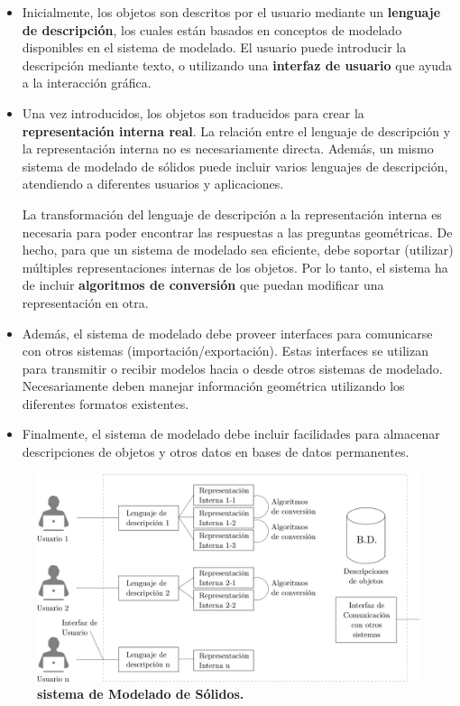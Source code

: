 \begin{itemize}
\item Inicialmente, los objetos son descritos por el usuario mediante un \textbf{lenguaje de descripción}, los cuales están basados en conceptos de modelado disponibles en el sistema de modelado. El usuario puede introducir la descripción mediante texto, o utilizando una \textbf{interfaz de usuario} que ayuda a la interacción gráfica.

\item Una vez introducidos, los objetos son traducidos para crear la \textbf{representación interna real}. La relación entre el lenguaje de descripción y la representación interna no es necesariamente directa. Además, un mismo sistema de modelado de sólidos puede incluir varios lenguajes de descripción, atendiendo a diferentes usuarios y aplicaciones.


 La transformación del lenguaje de descripción a la representación interna es necesaria para poder encontrar las respuestas a las preguntas geométricas. De hecho, para que un sistema de modelado sea eficiente, debe soportar (utilizar) múltiples representaciones internas de los objetos. Por lo tanto, el sistema ha de incluir \textbf{algoritmos de conversión} que puedan modificar una representación en otra.
 
 \item Además, el sistema de modelado debe proveer interfaces para comunicarse con otros sistemas (importación/exportación). Estas interfaces se utilizan para transmitir o recibir modelos hacia o desde otros sistemas de modelado. Necesariamente deben manejar información geométrica utilizando los diferentes formatos existentes.
 
\item Finalmente, el sistema de modelado debe incluir facilidades para almacenar descripciones de objetos y otros datos en bases de datos permanentes.

\end{itemize}

\begin{figure}[h]
\includegraphics[width=16cm]{Img/GEO/geo-sistema.jpg}
\centering
\caption{\textbf{ \footnotesize{sistema de Modelado de Sólidos. }}}
\end{figure}



